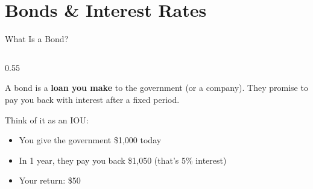 \documentclass[9pt,english,aspectratio=169]{beamer}
\begin{document}
\section{Bonds \& Interest Rates}

\begin{frame}{What Is a Bond?}

  \begin{columns}[T]
    \begin{column}{0.55\textwidth}
      \begin{definitionbox}[Bond]
        A bond is a \textbf{loan you make} to the government (or a company). They promise
        to pay you back with interest after a fixed period.
      \end{definitionbox}

      \vspace{0.8em}
      Think of it as an IOU:

      \vspace{0.5em}
      \begin{itemize}
        \item You give the government \$1{,}000 today
        \item In 1 year, they pay you back \$1{,}050 (that's 5\% interest)
        \item Your return: \$50
      \end{itemize}


\end{column}
\end{columns}
\end{frame}
\end{document}

